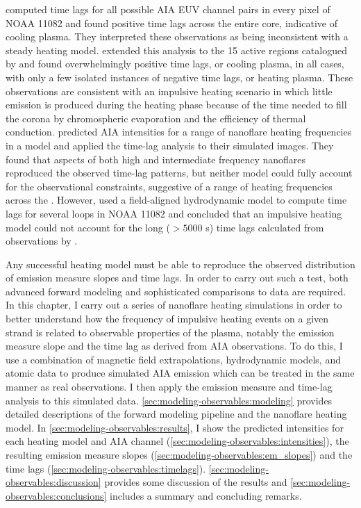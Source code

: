 \citet{viall_evidence_2012} computed time lags for all possible AIA EUV channel pairs in every pixel of \AR{} NOAA 11082 and found positive time lags across the entire \AR{} core, indicative of cooling plasma. They interpreted these observations as being inconsistent with a steady heating model. \citet{viall_survey_2017} extended this analysis to the 15 active regions catalogued by \citet{warren_systematic_2012} and found overwhelmingly positive time lags, or cooling plasma, in all cases, with only a few isolated instances of negative time lags, or heating plasma. These observations are consistent with an impulsive heating scenario in which little emission is produced during the heating phase because of the time needed to fill the corona by chromospheric evaporation and the efficiency of thermal conduction. \citet{bradshaw_patterns_2016} predicted AIA intensities for a range of nanoflare heating frequencies in a model \AR{} and applied the time-lag analysis to their simulated images. They found that aspects of both high and intermediate frequency nanoflares reproduced the observed time-lag patterns, but neither model could fully account for the observational constraints, suggestive of a range of heating frequencies across the \AR{}. However, \citet{lionello_can_2016} used a field-aligned hydrodynamic model to compute time lags for several loops in NOAA 11082 and concluded that an impulsive heating model could not account for the long ($>5000$ s) time lags calculated from observations by \citet{viall_evidence_2012}.

Any successful heating model must be able to reproduce the observed distribution of emission measure slopes and time lags. In order to carry out such a test, both advanced forward modeling and sophisticated comparisons to data are required. In this chapter, I carry out a series of nanoflare heating simulations in order to better understand how the frequency of impulsive heating events on a given strand is related to observable properties of the plasma, notably the emission measure slope and the time lag as derived from AIA observations. To do this, I use a combination of magnetic field extrapolations, hydrodynamic models, and atomic data to produce simulated AIA emission which can be treated in the same manner as real observations. I then apply the emission measure and time-lag analysis to this simulated data. \autoref{sec:modeling-observables:modeling} provides detailed descriptions of the forward modeling pipeline and the nanoflare heating model. In \autoref{sec:modeling-observables:results}, I show the predicted intensities for each heating model and AIA channel (\autoref{sec:modeling-observables:intensities}), the resulting emission measure slopes (\autoref{sec:modeling-observables:em_slopes}) and the time lags (\autoref{sec:modeling-observables:timelags}). \autoref{sec:modeling-observables:discussion} provides some discussion of the results and \autoref{sec:modeling-observables:conclusions} includes a summary and concluding remarks.

